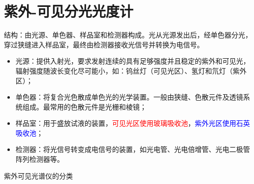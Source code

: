 \section{紫外-可见分光光度计}

结构：由光源、单色器、样品室和检测器构成。光从光源发出后，经单色器分光，穿过狭缝进入样品室，最终由检测器接收光信号并转换为电信号。
\begin{itemize}
    \item 光源：提供入射光，要求发射连续的具有足够强度并且稳定的紫外和可见光，辐射强度随波长变化尽可能小，如：钨丝灯（可见光区）、氢灯和氘灯（紫外区）；
    \item  单色器：将复合光色散成单色光的光学装置。一般由狭缝、色散元件及透镜系统组成。最常用的色散元件是光栅和棱镜；
    \item  样品室：用于盛放试液的装置，\textcolor{red}{可见光区使用玻璃吸收池}，\textcolor{blue}{紫外光区使用石英吸收池}；
    \item  检测器：将光信号转变成电信号的装置，如光电管、光电倍增管、光电二极管阵列检测器等。
\end{itemize}
紫外可见光谱仪的分类
